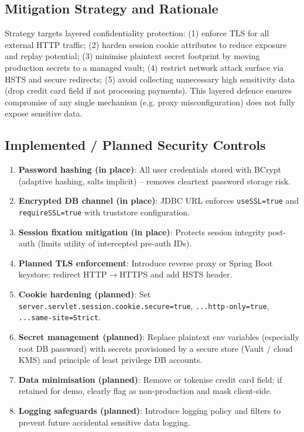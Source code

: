 \documentclass[]{UCD_CS_FYP_Report}
\begin{document}
\subsection{Mitigation Strategy and Rationale}
Strategy targets layered confidentiality protection: (1) enforce TLS for all external HTTP traffic; (2) harden session cookie attributes to reduce exposure and replay potential; (3) minimise plaintext secret footprint by moving production secrets to a managed vault; (4) restrict network attack surface via HSTS and secure redirects; (5) avoid collecting unnecessary high sensitivity data (drop credit card field if not processing payments). This layered defence ensures compromise of any single mechanism (e.g. proxy misconfiguration) does not fully expose sensitive data.

\subsection{Implemented / Planned Security Controls}
\begin{enumerate}
	\item \textbf{Password hashing (in place)}: All user credentials stored with BCrypt (adaptive hashing, salts implicit) -- removes cleartext password storage risk.
	\item \textbf{Encrypted DB channel (in place)}: JDBC URL enforces \texttt{useSSL=true} and \texttt{requireSSL=true} with truststore configuration.
	\item \textbf{Session fixation mitigation (in place)}: Protects session integrity post-auth (limits utility of intercepted pre-auth IDs).
	\item \textbf{Planned TLS enforcement}: Introduce reverse proxy or Spring Boot keystore; redirect HTTP\;$\rightarrow$\;HTTPS and add HSTS header.
	\item \textbf{Cookie hardening (planned)}: Set \texttt{server.servlet.session.cookie.secure=true}, \texttt{...http-only=true}, \texttt{...same-site=Strict}.
	\item \textbf{Secret management (planned)}: Replace plaintext env variables (especially root DB password) with secrets provisioned by a secure store (Vault / cloud KMS) and principle of least privilege DB accounts.
	\item \textbf{Data minimisation (planned)}: Remove or tokenise credit card field; if retained for demo, clearly flag as non-production and mask client-side.
	\item \textbf{Logging safeguards (planned)}: Introduce logging policy and filters to prevent future accidental sensitive data logging.
\end{enumerate}
\end{document}
